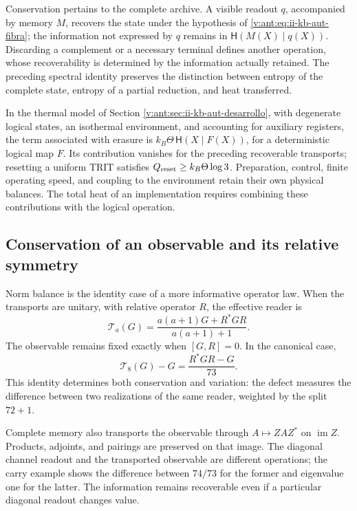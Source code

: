 Conservation pertains to the complete archive. A visible readout
\(q\), accompanied by memory \(M\), recovers the state under the
hypothesis of \eqref{v:ant:eq:ii-kb-aut-fibra}; the information not
expressed by \(q\) remains in
\(\mathsf H(M(X)\mid q(X))\). Discarding a complement or a
necessary terminal defines another operation, whose recoverability is
determined by the information actually retained. The preceding spectral
identity preserves the distinction between entropy of the complete
state, entropy of a partial reduction, and heat transferred.

In the thermal model of Section
\ref{v:ant:sec:ii-kb-aut-desarrollo}, with degenerate logical states,
an isothermal environment, and accounting for auxiliary registers, the
term associated with erasure is
\(k_B\Theta\,\mathsf H(X\mid F(X))\), for a deterministic logical
map \(F\). Its contribution vanishes for the preceding recoverable
transports; resetting a uniform TRIT satisfies
\(Q_{\rm reset}\geq k_B\Theta\log3\). Preparation, control,
finite operating speed, and coupling to the environment retain their
own physical balances. The total heat of an implementation requires
combining these contributions with the logical operation.

\subsection{Conservation of an observable and its relative symmetry}
\label{lib06:simetria}

Norm balance is the identity case of a more informative
operator law. When the transports are unitary, with relative operator
\(R\), the effective reader is
\begin{equation}
 \mathcal T_a(G)=\frac{a(a+1)G+R^*GR}{a(a+1)+1}.
 \label{lib06:lector}
\end{equation}
The observable remains fixed exactly when \([G,R]=0\).
In the canonical case,
\begin{equation}
 \mathcal T_8(G)-G=\frac{R^*GR-G}{73}.
 \label{lib06:defecto-lector}
\end{equation}
This identity determines both conservation and variation:
the defect measures the difference between two realizations of the same
reader, weighted by the split \(72+1\).

Complete memory also transports the observable through
\(A\mapsto ZAZ^*\) on \(\operatorname{im}Z\). Products,
adjoints, and pairings are preserved on that image. The diagonal
channel readout and the transported observable are different
operations; the carry example shows the difference between
\(74/73\) for the former and eigenvalue one for the latter.
The information remains recoverable even if a particular diagonal
readout changes value.

